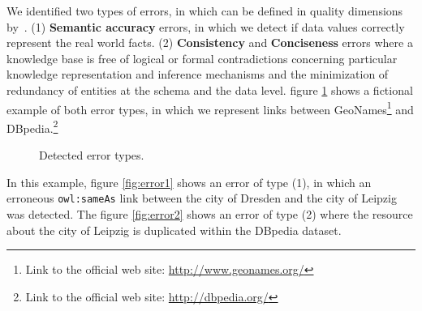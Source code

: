 We identified two types of errors, in which can be defined in quality dimensions by~\cite{zaveri2015quality}. (1) \textbf{Semantic accuracy} errors, in which we detect if data values correctly represent the real world facts. (2) \textbf{Consistency} and \textbf{Conciseness} errors where a knowledge base is free of logical or formal contradictions concerning particular knowledge representation and inference mechanisms and the minimization of redundancy of entities at the schema and the data level. 
figure \ref{fig:errorType} shows a fictional example of both error types, in which we represent links between  GeoNames\footnote{Link to the official web site: \url{http://www.geonames.org/}} and DBpedia.\footnote{Link to the official web site: \url{http://dbpedia.org/}}
\begin{figure}[H]
	\centering
	\caption{Detected error types.}
	\label{fig:errorType}
\end{figure}
%
In this example, figure \ref{fig:error1} shows an error of type (1), in which an erroneous \texttt{owl:sameAs} link between the city of Dresden and the city of Leipzig was detected. The figure \ref{fig:error2} shows an error of type (2) where the resource about the city of Leipzig is duplicated within the DBpedia dataset. 

